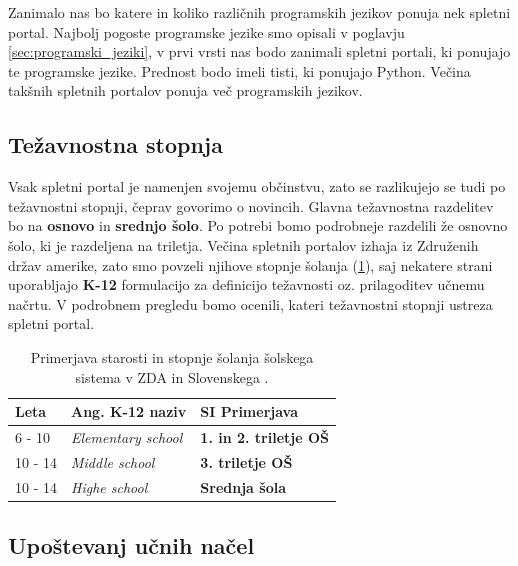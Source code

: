 Zanimalo nas bo katere in koliko različnih programskih jezikov ponuja
nek spletni portal. Najbolj pogoste programske jezike smo opisali v
poglavju \ref{sec:programski_jeziki}, v prvi vrsti nas bodo zanimali
spletni portali, ki ponujajo te programske jezike. Prednost bodo imeli
tisti, ki ponujajo Python. Večina takšnih spletnih portalov ponuja več
programskih jezikov.

\subsection{Težavnostna stopnja}
\label{sec:težavnostna_stopnja}

Vsak spletni portal je namenjen svojemu občinstvu, zato se razlikujejo
se tudi po težavnostni stopnji, čeprav govorimo o novincih. Glavna
težavnostna razdelitev bo na \textbf{osnovo} in \textbf{srednjo
  šolo}. Po potrebi bomo podrobneje razdelili že osnovno šolo, ki je
razdeljena na triletja. Večina spletnih portalov izhaja iz Združenih
držav amerike, zato smo povzeli njihove stopnje šolanja
(\ref{tab:primerjava_šolski}), saj nekatere strani uporabljajo
\textbf{K-12} formulacijo za definicijo težavnosti oz. prilagoditev
učnemu načrtu. V podrobnem pregledu bomo ocenili, kateri težavnostni
stopnji ustreza spletni portal.

\begin{table}[!h]
\caption{Primerjava starosti in stopnje šolanja šolskega sistema v ZDA
  in Slovenskega \cite{wiki:k12}.}
\label{tab:primerjava_šolski}
\begin{tabular}{
  | p{} |
  p{} |
  p{} |  }
\hline
  \rowcolor{sbase01!100}
  \textbf{Leta} & \textbf{Ang. K-12 naziv} & \textbf{SI Primerjava} \\
        \hline
      6 - 10    & \emph{Elementary school} & \textbf{1. in 2. triletje
                                             OŠ}\\
        \hline
      10 - 14    & \emph{Middle school} & \textbf{3. triletje OŠ} \\
        \hline
      10 - 14    & \emph{Highe school} & \textbf{Srednja šola} \\
  \hline
\end{tabular}
\end{table}

\subsection{Upoštevanj učnih načel}
\label{sec:upoštevanje_načel}

